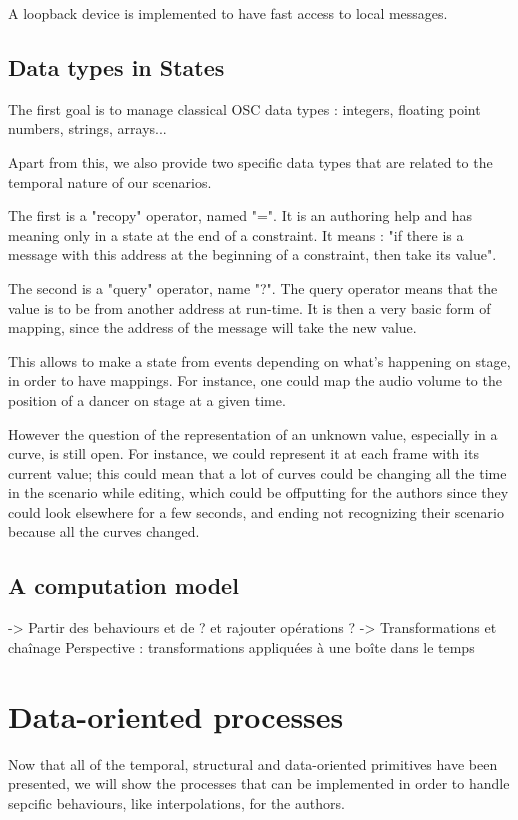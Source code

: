 \documentclass{sigchi}
\begin{document}
A loopback device is implemented to have fast access to local messages.

\subsection{Data types in States}
The first goal is to manage classical OSC data types : integers, floating point numbers, strings, arrays...

Apart from this, we also provide two specific data types that are related to the temporal nature of our scenarios.

The first is a "recopy" operator, named "=". It is an authoring help and has meaning only in a state at the end of a constraint. It means : "if there is a message with this address at the beginning of a constraint, then take its value".

The second is a "query" operator, name "?". The query operator means that the value is to be from another address at run-time. It is then a very basic form of mapping, since the address of the message will take the new value.

This allows to make a state from events depending on what's happening on stage, in order to have mappings. For instance, one could map the audio volume to the position of a dancer on stage at a given time.

However the question of the representation of an unknown value, especially in a curve, is still open. For instance, we could represent it at each frame with its current value; this could mean that a lot of curves could be changing all the time in the scenario while editing, which could be offputting for the authors since they could look elsewhere for a few seconds, and ending not recognizing their scenario because all the curves changed. 
\subsection{A computation model}

-> Partir des behaviours et de ? et rajouter opérations ?
-> Transformations et chaînage
Perspective : transformations appliquées à une boîte dans le temps


\section{Data-oriented processes}
Now that all of the temporal, structural and data-oriented primitives have been presented, we will show the processes that can be implemented in order to handle sepcific behaviours, like interpolations, for the authors.
\end{document}
